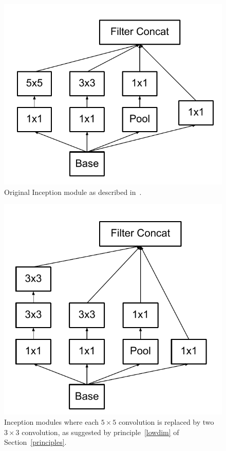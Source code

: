 \begin{figure}
\centering
\includegraphics[width=\linewidth]{inceptionv1}
\caption{Original Inception module as described in~\cite{szegedy2015going}.}
\label{fig:inceptionv1}
\end{figure}
\begin{figure}
\centering
\includegraphics[width=\linewidth]{inceptionv2}
\caption{Inception modules where each $5\times 5$ convolution is replaced by
  two $3\times 3$ convolution, as suggested by principle~\ref{lowdim} of Section~\ref{principles}.}
\label{fig:inceptionv2}
\end{figure}
